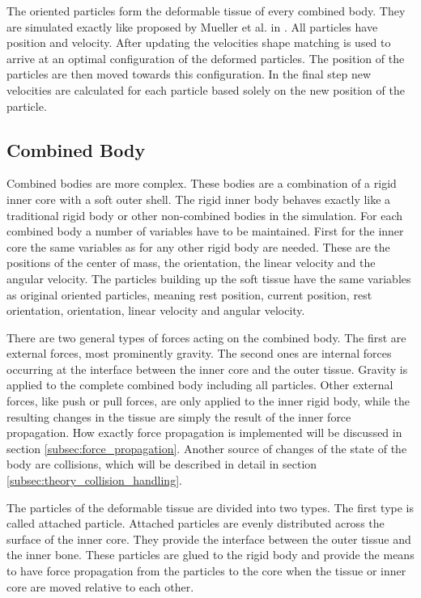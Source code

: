 The oriented particles form the deformable tissue of every combined body. They are simulated exactly like proposed by Mueller et al. in \cite{Muller:2011gn}. All particles have position and velocity. After updating the velocities shape matching is used to arrive at an optimal configuration of the deformed particles. The position of the particles are then moved towards this configuration. In the final step new velocities are calculated for each particle based solely on the new position of the particle.

\subsection{Combined Body}
\label{subsec:combined_body}
Combined bodies are more complex. These bodies are a combination of a rigid inner core with a soft outer shell. The rigid inner body behaves exactly like a traditional rigid body or other non-combined bodies in the simulation. For each combined body a number of variables have to be maintained. First for the inner core the same variables as for any other rigid body are needed. These are the positions of the center of mass, the orientation, the linear velocity and the angular velocity. The particles building up the soft tissue have the same variables as original oriented particles, meaning rest position, current position, rest orientation, orientation, linear velocity and angular velocity.

There are two general types of forces acting on the combined body. The first are external forces, most prominently gravity. The second ones are internal forces occurring at the interface between the inner core and the outer tissue. Gravity is applied to the complete combined body including all particles. Other external forces, like push or pull forces, are only applied to the inner rigid body, while the resulting changes in the tissue are simply the result of the inner force propagation. How exactly force propagation is implemented will be discussed in section \ref{subsec:force_propagation}. Another source of changes of the state of the body are collisions, which will be described in detail in section \ref{subsec:theory_collision_handling}.

The particles of the deformable tissue are divided into two types. The first type is called attached particle. Attached particles are evenly distributed across the surface of the inner core. They provide the interface between the outer tissue and the inner bone. These particles are glued to the rigid body and provide the means to have force propagation from the particles to the core when the tissue or inner core are moved relative to each other.

